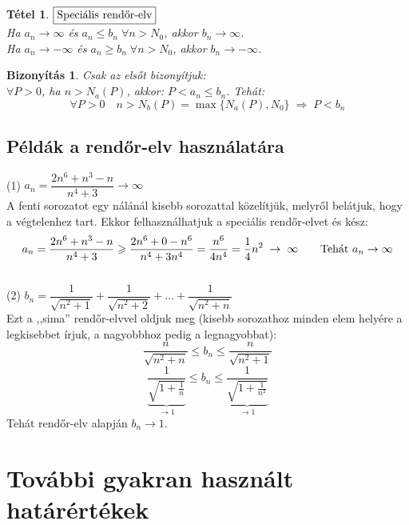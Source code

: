 \documentclass[a4paper,12pt,twoside]{book}
\newtheorem{tetel}{Tétel}[chapter]
\theoremstyle{break}
\newtheorem{biz}{Bizonyítás}[chapter]
\theoremstyle{plain}
\begin{document}
\begin{tetel}$\boxed{$Speciális rendőr-elv$}$\\
Ha $a_n\to\infty$ és $a_n\leqslant b_n \; \forall n>N_0$, akkor $b_n\to\infty$.\\
Ha $a_n\to-\infty$ és $a_n\geqslant b_n \; \forall n>N_0$, akkor $b_n\to-\infty$.
\end{tetel}
\begin{biz}
Csak az elsőt bizonyítjuk:\\
$\forall P>0$, ha $n>N_a(P)$, akkor: $P<a_n\leqslant b_n$. Tehát:
\[\forall P>0 \quad n>N_b(P) = \max\{N_a(P),N_0\} \; \Rightarrow \; P<b_n\]
\end{biz}

\subsection{Példák a rendőr-elv használatára}

(1) $a_n=\dfrac{2n^6+n^3-n}{n^4+3} \to \infty$\\
A fenti sorozatot egy nálánál kisebb sorozattal közelítjük, melyről belátjuk, hogy a végtelenhez tart. Ekkor felhasználhatjuk a speciális rendőr-elvet és kész:
\[a_n=\frac{2n^6+n^3-n}{n^4+3}\geqslant\frac{2n^6+0-n^6}{n^4+3n^4}=\frac{n^6}{4n^4}=\frac{1}{4}n^2 \; \to \; \infty \qquad \hbox{Tehát } a_n\to\infty\]\\

(2) $b_n=\dfrac{1}{\sqrt{n^2+1}}+\dfrac{1}{\sqrt{n^2+2}}+\ldots+\dfrac{1}{\sqrt{n^2+n}}$\\
Ezt a ,,sima'' rendőr-elvvel oldjuk meg (kisebb sorozathoz minden elem helyére a legkisebbet írjuk, a nagyobbhoz pedig a legnagyobbat):
\[\frac{n}{\sqrt{n^2+n}} \leqslant b_n \leqslant \frac{n}{\sqrt{n^2+1}}\]
\[\underbrace{\frac{1}{\sqrt{1+\frac{1}{n}}}}_{\to 1} \leqslant b_n \leqslant \underbrace{\frac{1}{\sqrt{1+\frac{1}{n^2}}}}_{\to 1}\]
Tehát rendőr-elv alapján $b_n\to 1$.

\section{További gyakran használt határértékek}
\end{document}
